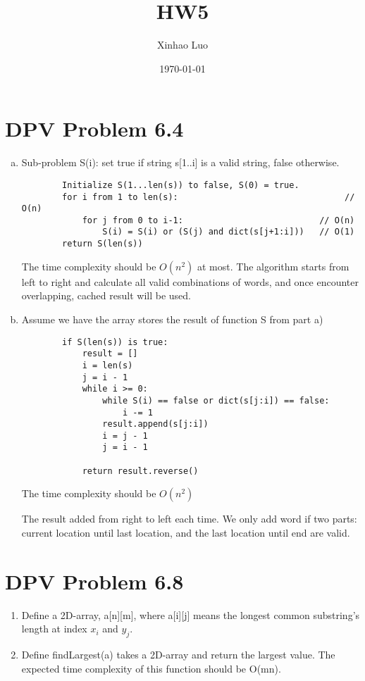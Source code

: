 \documentclass{article}
\title{HW5}
\author{Xinhao Luo}
\date{\today}
\def\math#1{$#1$}
\begin{document}
\maketitle

\section{DPV  Problem 6.4}

\begin{enumerate}[a)]
    \item Sub-problem S(i): set true if string s[1..i] is a valid string, false otherwise.
        \begin{verbatim}
        Initialize S(1...len(s)) to false, S(0) = true.
        for i from 1 to len(s):                                 // O(n)
            for j from 0 to i-1:                           // O(n)
                S(i) = S(i) or (S(j) and dict(s[j+1:i]))   // O(1)
        return S(len(s))
        \end{verbatim}
        The time complexity should be \math{O(n^2)} at most.
        The algorithm starts from left to right and calculate all valid combinations of words, and once encounter overlapping, cached result will be used.
    \item Assume we have the array stores the result of function S from part a) 
    \begin{verbatim}
        if S(len(s)) is true:
            result = []
            i = len(s)
            j = i - 1
            while i >= 0:
                while S(i) == false or dict(s[j:i]) == false:
                    i -= 1
                result.append(s[j:i])
                i = j - 1
                j = i - 1
            
            return result.reverse()
    \end{verbatim}
    The time complexity should be \math{O(n^2)}  
    
    The result added from right to left each time. We only add word if two parts: current location until last location, and the last location until end are valid.
\end{enumerate}

\section{DPV Problem 6.8}
\begin{enumerate}
    \item Define a 2D-array, a[n][m], where a[i][j] means the longest common substring's length at index \math{x_i} and \math{y_j}.
    \item Define findLargest(a) takes a 2D-array and return the largest value. The expected time complexity of this function should be O(mn).
\end{enumerate}
\end{document}
